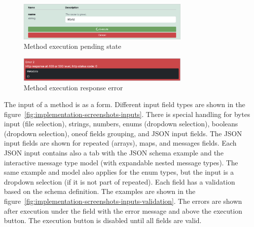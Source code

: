 \begin{figure}[!htb]
    \centering
    \captionsetup{justification=centering}
    \includegraphics[width=0.75\textwidth]{images/implementation/screenshots/execution-pending}
    \caption{Method execution pending state}
    \label{fig:implementation-screenshots-execution-pending}
\end{figure}

\begin{figure}[!htb]
    \centering
    \captionsetup{justification=centering}
    \includegraphics[width=0.75\textwidth]{images/implementation/screenshots/response-error}
    \caption{Method execution response error}
    \label{fig:implementation-screenshots-response-error}
\end{figure}

The input of a method is as a form.
Different input field types are shown in the figure~\ref{fig:implementation-screenshots-inputs}.
There is special handling for bytes input (file selection), strings, numbers, enums (dropdown selection), booleans (dropdown selection), oneof fields grouping, and JSON input fields.
The JSON input fields are shown for repeated (arrays), maps, and messages fields.
Each JSON input contains also a tab with the JSON schema example and the interactive message type model (with expandable nested message types).
The same example and model also applies for the enum types, but the input is a dropdown selection (if it is not part of repeated).
Each field has a validation based on the schema definition.
The examples are shown in the figure~\ref{fig:implementation-screenshots-inputs-validation}.
The errors are shown after execution under the field with the error message and above the execution button.
The execution button is disabled until all fields are valid.

